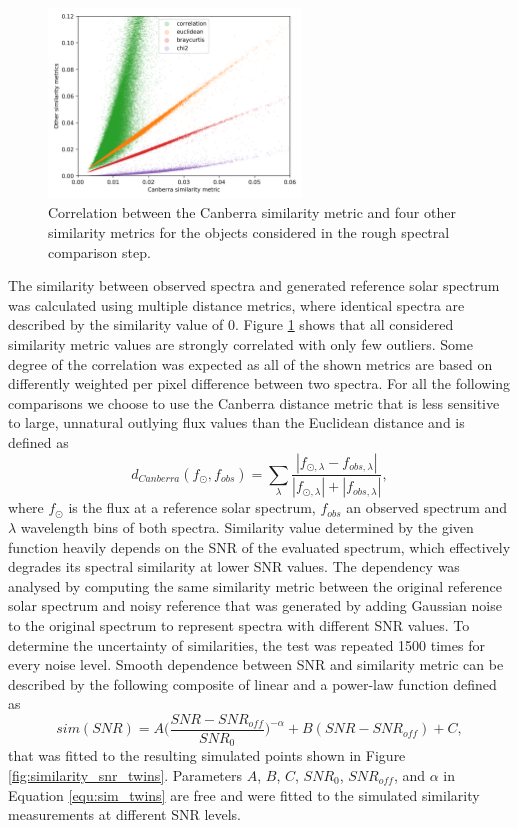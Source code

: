 \begin{figure}
	\centering
	\includegraphics[width=0.6\textwidth]{sim_combine_b2.png}
	\caption{Correlation between the Canberra similarity metric and four other similarity metrics for the objects considered in the rough spectral comparison step.}
	\label{fig:sim_combine_twins}
\end{figure}

The similarity between observed spectra and generated reference solar spectrum was calculated using multiple distance metrics, where identical spectra are described by the similarity value of 0. Figure \ref{fig:sim_combine_twins} shows that all considered similarity metric values are strongly correlated with only few outliers. Some degree of the correlation was expected as all of the shown metrics are based on differently weighted per pixel difference between two spectra. For all the following comparisons we choose to use the Canberra distance metric \cite{Lance1967MixedDataCP} that is less sensitive to large, unnatural outlying flux values than the Euclidean distance and is defined as 
\begin{equation}
	\label{equ:equ_canberra}
	d_{Canberra}(f_{\odot}, f_{obs}) = \sum_{\lambda}^{\ } \frac{|f_{\odot,\lambda} - f_{obs,\lambda}|}{|f_{\odot,\lambda}| + |f_{obs,\lambda}|},
\end{equation}
where $f_{\odot}$ is the flux at a reference solar spectrum, $f_{obs}$ an observed spectrum and $\lambda$ wavelength bins of both spectra. Similarity value determined by the given function heavily depends on the SNR of the evaluated spectrum, which effectively degrades its spectral similarity at lower SNR values. The dependency was analysed by computing the same similarity metric between the original reference solar spectrum and noisy reference that was generated by adding Gaussian noise to the original spectrum to represent spectra with different SNR values. To determine the uncertainty of similarities, the test was repeated 1500 times for every noise level. Smooth dependence between SNR and similarity metric can be described by the following composite of linear and a power-law function defined as
\begin{equation}
	\label{equ:sim_twins}
	sim(SNR) = A \Big(\frac{SNR-SNR_{off}}{SNR_0}\Big)^{-\alpha} + B (SNR-SNR_{off}) + C,
\end{equation}
that was fitted to the resulting simulated points shown in Figure \ref{fig:similarity_snr_twins}. Parameters $A$, $B$, $C$, $SNR_0$, $SNR_{off}$, and $\alpha$ in Equation \ref{equ:sim_twins} are free and were fitted to the simulated similarity measurements at different SNR levels.

